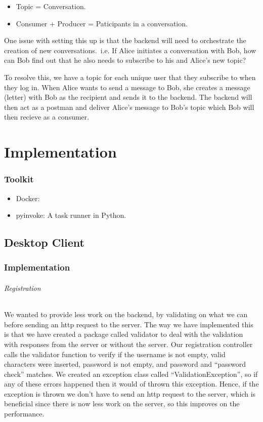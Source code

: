 \documentclass[11pt,a4paper]{report}
\begin{document}
\begin{itemize}
  \item Topic = Conversation.
  \item Consumer + Producer = Paticipants in a conversation.
\end{itemize}

One issue with setting this up is that the backend will need to orchestrate the creation of new conversations.\ i.e. If Alice initiates a conversation with Bob, how can Bob find out that he also needs to subscribe to his and Alice's new topic?

To resolve this, we have a topic for each unique user that they subscribe to when they log in. When Alice wants to send a message to Bob, she creates a message (letter) with Bob as the recipient and sends it to the backend. The backend will then act as a postman and deliver Alice's message to Bob's topic which Bob will then recieve as a consumer.

\chapter{Implementation}

\subsection{Toolkit}

\begin{itemize}
  \item Docker:
  \item pyinvoke: A task runner in Python.
\end{itemize}

\section{Desktop Client}

\subsection{Implementation}

\subparagraph{Registration}
We wanted to provide less work on the backend, by validating on what we can before sending an http request to the server. The way we have implemented this is that we have created a package called validator to deal with the validation with responses from the server or without the server. Our registration controller calls the validator function to verify if the username is not empty, valid characters were inserted, password is not empty, and password and “password check” matches. We created an exception class called “ValidationException”, so if any of these errors happened then it would of thrown this exception. Hence, if the exception is thrown we don’t have to send an http request to the server, which is beneficial since there is now less work on the server, so this improves on the performance.
\end{document}
